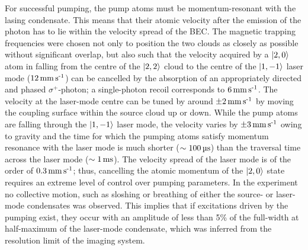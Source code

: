For successful pumping, the pump atoms must be momentum-resonant with the lasing condensate.  This means that their atomic velocity after the emission of the photon has to lie within the velocity spread of the BEC.  The magnetic trapping frequencies were chosen not only to position the two clouds as closely as possible without significant overlap, but also such that the velocity acquired by a ${\left|2, 0\right>}$ atom in falling from the centre of the ${\left|2, 2\right>}$ cloud to the centre of the ${\left|1, -1\right>}$ laser mode ($\unit[12]{mm\, s\textsuperscript{-1}}$) can be cancelled by the absorption of an appropriately directed and phased $\sigma^{+}$-photon; a single-photon recoil corresponds to $\unit[6]{mm\, s\textsuperscript{-1}}$.  The velocity at the laser-mode centre can be tuned by around $\unit[\pm 2]{mm\, s\textsuperscript{-1}}$ by moving the coupling surface within the source cloud up or down.  While the pump atoms are falling through the ${\left|1, -1\right>}$ laser mode, the velocity varies by $\unit[\pm 3]{mm\, s\textsuperscript{-1}}$ owing to gravity and the time for which the pumping atoms satisfy momentum resonance with the laser mode is much shorter ($\sim \unit[100]{\micro s}$) than the traversal time across the laser mode ($\sim\unit[1]{ms}$).  The velocity spread of the laser mode is of the order of $\unit[0.3]{mm\, s\textsuperscript{-1}}$; thus, cancelling the atomic momentum of the ${\left|2, 0\right>}$ state requires an extreme level of control over pumping parameters.  In the experiment no collective motion, such as sloshing or breathing of either the source- or laser-mode condensates was observed.  This implies that if excitations driven by the pumping exist, they occur with an amplitude of less than 5\% of the full-width at half-maximum of the laser-mode condensate, which was inferred from the resolution limit of the imaging system.

